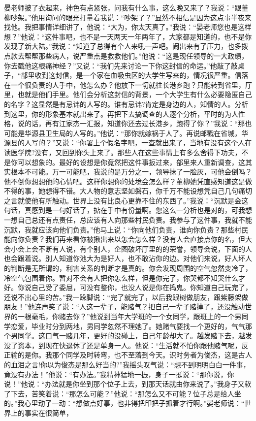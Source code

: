 \documentclass[12pt,oneside]{book}
\begin{document}
晏老师披了衣起来，神色有点紧张，问我有什么事，这么晚又来了？我说：``跟董柳吵架。''他用询问的眼光打量着我说：``吵架了？''显然不相信是因为这点事半夜来找他。我把事情详细讲了，他说：``大为，你太天真了。''我说：``晏老师您也是这样想？''他说：``这件事吧，也不是一天两天一年两年了，大家都是知道的，也不是你发现了新大陆。''我说：``知道了总得有个人来吼一声吧。闹出来有了压力，也多拨点款去帮帮那些病人，说严重点是救救他们。''他说：``这是现任领导的一大政绩，你去戳他这根痛神经？''又说：``我们先来讨论一下你这封信的命运。''他敲了敲桌子，``部里收到这封信，是一个家在血吸虫区的大学生写来的，情况很严重。信落在一个很负责的人手中，他怎么办？他放下一切就往长港乡跑？只能转到省里，厅里，也就是他们手里。他们会分析这封信的背景，一个大学生有什么必要隐匿自己的名字？这显然是有忌讳的人写的。谁有忌讳?肯定是身边的人，知情的人。分析到这里，你的形象基本就出来了。再把下去搞调查的人逐个分析，平时的为人性格，说的话，再有江家杰一汇报，知道你还去过长港乡，跑得了你？''我说：``那也可能是华源县卫生局的人写的。''他说：``那你就嫁祸于人了。再说邮戳在省城，华源县的人写的？''又说：``你署上个假名字吧，一查就出来了，当地有没有这个人在读医学院?没有，又回到你头上来了。那些人在这些事情上有多么舍得下功夫，不是你可以想象的。最好的设想是你竟然把这件事扳过来，部里来人重新调查，这其实根本不可能。万一可能吧，我说的是万分之一，领导抹了一脸灰，可他会倒吗？他不倒你想想他的心情吧。这样你想你的处境会怎么样？董柳她凭直感知道这是做不得的事，她想得不错。大人物的意志坚如磐石，你千万不能设想凭自己几句痛切之言就使他有所触动。世界上没有比良心更靠不住的东西了。''我说：``沉默是金这句话，真感到是一句好话了，掂在手中有份量啊。您这么一分析也是对的，可我想一想自己总还有点责任，总应该有人向那些村民负责。我参与了这件事，我就不能沉默，我就应该向他们负责。''他马上说：``你向他们负责，谁向你负责？那些村民能向你负责？我们再来看你被揪出来以怎会怎么样？没有人会直接点你的名，但大会小会上会不断有人说，有个别人，企图破坏厅里的的荣誉，领导会说，下面的人也会跟着说。别人知道你池大为是好人，也不敢沾你的边。对他们来说，好人坏人的判断是无所谓的，利害关系的判断才是真的。你会发现周围的空气忽然变冷了，冷空气包围着你。暂对不会有人把你怎么样，但是你完了，你哭都不知哭什么才好。你说自己受了委屈，可没有整你，也没人说是你在捣鬼。你知道自己玩完了，还说不出心里的苦。''我一跺脚说：``完了就完了，以后我跟树做朋友，跟紫藤架做朋友！''他连声笑了说：``人这一辈子，能赌气？把自己一辈子赌掉了，还没触动世界的一根毫毛，你赌去你？''他说到当年大学班的一个女同学，跟班上的一个男同学恋爱，毕业时分到两地，男同学忽然不理她了。她赌气要找一个更好的，气气那个男同学。这口气一赌几年，更好的没碰上，自己年龄却大了。越发赌下去，越发没了资本，到现在快退休了还是单身一人。他说：``生活就不怕你跟他赌气呢，反正输的是你。我那个同学及时转弯，也不至落到今天。识时务者为俊杰，这是古人的血泪之言!你以为俊杰是那么好当的?''我摇头叹气说：``想不到明明白白一件事，竟没有办法！''他说：``有办法。''我精神猛地一振，身子一挺说：``那你说，你说！''他说：``办法就是你坐到那个位子上去，到那天话就由你来说了。''我身子又软了下去，苦笑着说：``那怎么可能？''他说：``那怎么又不可能？位子总是给人坐的。''我心里动了一动：``想做点好事，也非得把印把子抓着才行啊。''晏老师说：``世界上的事实在很简单，
\end{document}
